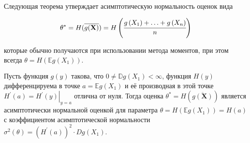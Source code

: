 \begin{rmrk}
Следующая теорема утверждает асимптотическую нормальность оценок вида

\begin{equation*}
    \theta^{*}=H(\overline{g(\mathbf{X})})=H\left(\cfrac{g\left(X_{1}\right)+\ldots+g\left(X_{n}\right)}{n}\right)
\end{equation*}

которые обычно получаются при использовании метода моментов, при этом всегда $\theta=H\left(\mathbb{E} g\left(X_{1}\right)\right)$.
\end{rmrk}

\begin{thm*}
Пусть функция $g(y)$ такова, что $0 \neq \mathbb{D} g\left(X_{1}\right)<\infty$, функция $H(y)$ дифференцируема в точке $a=\mathbb{E} g\left(X_{1}\right)$ и её производная в этой точке $H^{\prime}(a)=\left.H^{\prime}(y)\right|_{y=a}$ отлична от нуля. Тогда оценка $\theta^{*}=H(\overline{g(\mathbf{X})})$
является асимптотически нормальной
оценкой для параметра $\theta=H\left(\mathbb{E} g\left(X_{1}\right)\right)=H(a)$ с коэффициентом асимптотической нормальности $\sigma^{2}(\theta)=\left(H^{\prime}(a)\right)^{2} \cdot D g\left(X_{1}\right)$.
\end{thm*}

